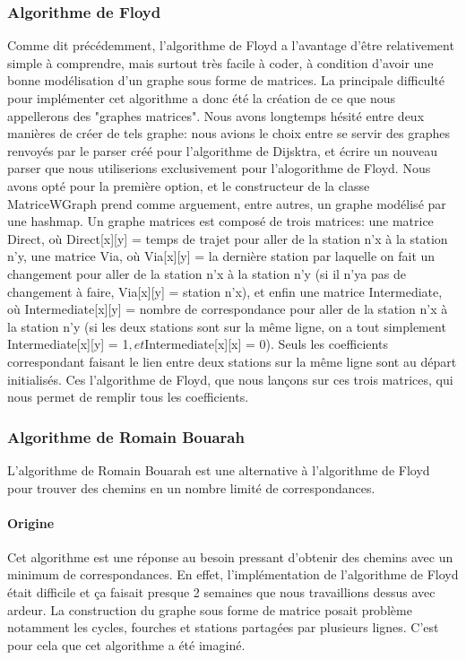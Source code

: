 \documentclass[french, 12pt]{article}
\begin{document}
\subsubsection{Algorithme de Floyd}
Comme dit précédemment, l'algorithme de Floyd a l'avantage d'être relativement simple à comprendre, mais surtout très facile à coder, à condition d'avoir une bonne modélisation d'un graphe sous forme de matrices.
La principale difficulté pour implémenter cet algorithme a donc été la création de ce que nous appellerons des "graphes matrices". Nous avons longtemps hésité entre deux manières de créer de tels graphe: nous avions le choix entre se servir des graphes 
renvoyés par le parser créé pour l'algorithme de Dijsktra, et écrire un nouveau parser que nous utiliserions exclusivement pour l'alogorithme de Floyd. Nous avons opté pour la première option, et le constructeur de la classe MatriceWGraph prend comme arguement, entre autres,
un graphe modélisé par une hashmap. Un graphe matrices est composé de trois matrices: une matrice Direct, où Direct[x][y] = temps de trajet pour aller de la station n'x à la station n'y, une matrice Via, où
Via[x][y] = la dernière station par laquelle on fait un changement pour aller de la station n'x à la station n'y (si il n'ya pas de changement à faire, Via[x][y] = station n'x), et enfin une matrice Intermediate, où
Intermediate[x][y] = nombre de correspondance pour aller de la station n'x à la station n'y (si les deux stations sont sur la même ligne, on a tout simplement Intermediate[x][y] = 1$, et $Intermediate[x][x] = 0).
Seuls les coefficients correspondant faisant le lien entre deux stations sur la même ligne sont au départ initialisés. Ces l'algorithme de Floyd, que nous lançons sur ces trois matrices, qui nous permet de remplir tous les coefficients.  

\subsubsection{Algorithme de Romain Bouarah}
L'algorithme de Romain Bouarah est une alternative à l'algorithme de Floyd pour trouver des chemins en un nombre limité de correspondances.

\paragraph{Origine}
Cet algorithme est une réponse au besoin pressant d'obtenir des chemins avec un minimum de correspondances.
En effet, l'implémentation de l'algorithme de Floyd était difficile et ça faisait presque 2 semaines que nous travaillions dessus avec ardeur.
La construction du graphe sous forme de matrice posait problème notamment les cycles, fourches et stations partagées par plusieurs lignes.
C'est pour cela que cet algorithme a été imaginé.
\end{document}
